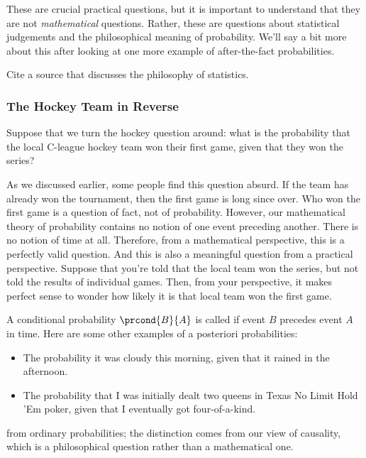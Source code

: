 These are crucial practical questions, but it is important to
understand that they are not \emph{mathematical} questions.  Rather,
these are questions about statistical judgements and the philosophical
meaning of probability.  We'll say a bit more about this after looking
at one more example of after-the-fact probabilities.

\begin{editingnotes}
Cite a source that discusses the philosophy of statistics.
\end{editingnotes}

\subsubsection{The Hockey Team in Reverse}\label{reverse-hockey}

Suppose that we turn the hockey question around: what is the
probability that the local C-league hockey team won their first game,
given that they won the series?

As we discussed earlier, some people find this question absurd.  If
the team has already won the tournament, then the first game is long
since over.  Who won the first game is a question of fact, not of
probability.  However, our mathematical theory of probability contains
no notion of one event preceding another.  There is no notion of time
at all.  Therefore, from a mathematical perspective, this is a
perfectly valid question.  And this is also a meaningful question from
a practical perspective.  Suppose that you're told that the local team
won the series, but not told the results of individual games.  Then,
from your perspective, it makes perfect sense to wonder how likely it
is that local team won the first game.

A conditional probability $\prcond{B}{A}$ is called   if event $B$ precedes event $A$ in time.  Here are some
other examples of a posteriori probabilities:
%
\begin{itemize}
\item The probability it was cloudy this morning, given that it rained
in the afternoon.
\item The probability that I was initially dealt two queens in Texas
No Limit Hold 'Em poker, given that I eventually got four-of-a-kind.
\end{itemize}
from ordinary probabilities; the distinction comes from our view of
causality, which is a philosophical question rather than a
mathematical one.

